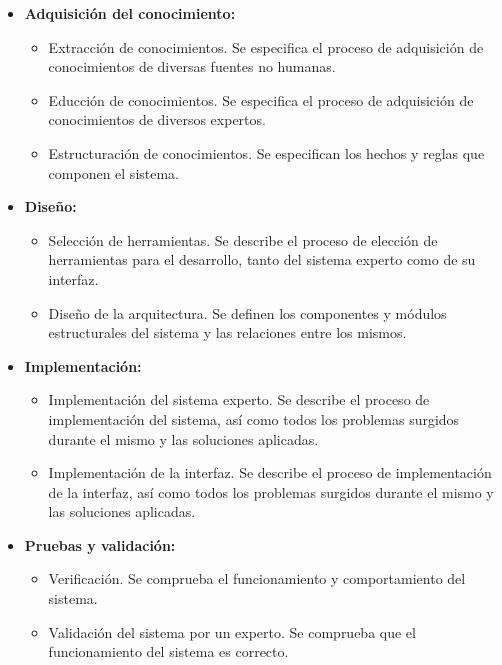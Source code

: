 \bigskip

\begin{itemize}
	\item \textbf{Adquisición del conocimiento:}
	\begin{itemize}
		\item Extracción de conocimientos. Se especifica el proceso de adquisición de conocimientos de diversas fuentes no humanas.
		\item Educción de conocimientos. Se especifica el proceso de adquisición de conocimientos de diversos expertos.
		\item Estructuración de conocimientos. Se especifican los hechos y reglas que componen el sistema.
	\end{itemize}
\end{itemize}

\bigskip

\begin{itemize}
	\item \textbf{Diseño:}
	\begin{itemize}
		\item Selección de herramientas. Se describe el proceso de elección de herramientas para el desarrollo, tanto del sistema experto como de su interfaz.
		\item Diseño de la arquitectura. Se definen los componentes y módulos estructurales del sistema y las relaciones entre los mismos.
	\end{itemize}
\end{itemize}

\bigskip

\begin{itemize}
	\item \textbf{Implementación:}
	\begin{itemize}
		\item Implementación del sistema experto. Se describe el proceso de implementación del sistema, así como todos los problemas surgidos durante el mismo y las soluciones aplicadas.
		\item Implementación de la interfaz. Se describe el proceso de implementación de la interfaz, así como todos los problemas surgidos durante el mismo y las soluciones aplicadas.
	\end{itemize}
\end{itemize}

\bigskip

\begin{itemize}
	\item \textbf{Pruebas y validación:}
	\begin{itemize}
		\item Verificación. Se comprueba el funcionamiento y comportamiento del sistema.
		\item Validación del sistema por un experto. Se comprueba que el funcionamiento del sistema es correcto.
	\end{itemize}
\end{itemize}

